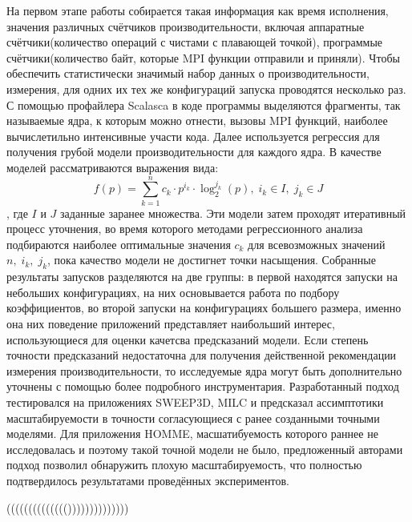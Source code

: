 На первом этапе работы собирается такая информация как время исполнения, значения различных счётчиков производительности, включая аппаратные счётчики(количество операций с чистами с плавающей точкой), программые счётчики(количество байт, которые MPI функции отправили и приняли). Чтобы обеспечить статистически значимый набор данных о производительности, измерения, для одних их тех же конфигураций запуска проводятся несколько раз. \label{several_times_test}%
С помощью профайлера Scalasca в коде программы выделяются фрагменты, так называемые ядра, к которым можно отнести, вызовы MPI функций, наиболее вычислетильно интенсивные участи кода. Далее используется регрессия для получения грубой модели производительности для каждого ядра. В качестве моделей рассматриваются выражения вида:
\begin{equation}
f(p) = \sum \limits_{k=1}^{n} c_k \cdot p^{i_k} \cdot \log_2^{j_k}(p),\; i_k \in I,\; j_k \in J 
\end{equation}, где \(I\) и \(J\) заданные заранее множества. Эти модели затем проходят итеративный процесс уточнения, во время которого методами регрессионного анализа подбираются наиболее оптимальные значения \(c_k\) для всевозможных значений \(n,\;i_{k},\;j_{k}\), пока качество модели не достигнет точки насыщения. Собранные результаты запусков разделяются на две группы: в первой находятся запуски на небольших конфигурациях, на них основывается работа по подбору коэффициентов, во второй \- запуски на конфигурациях большего размера, именно она них поведение приложений представляет наибольший интерес, использующиеся для оценки качетсва предсказаний модели. Если степень точности предсказаний недостаточна для получения действенной рекомендации измерения производительности, то исследуемые ядра могут быть дополнительно уточнены с помощью более подробного инструментария. Разработанный подход тестировался на приложениях SWEEP3D, MILC и предсказал ассимптотики масштабируемости в точности согласующиеся с ранее созданными точными моделями. Для приложения HOMME, масшатибуемость которого раннее не исследовалась и поэтому такой точной модели не было, предложенный авторами подход позволил обнаружить плохую масштабируемость, что полностью подтвердилось результатами проведённых экспериментов.

(((((((((((((())))))))))))))

